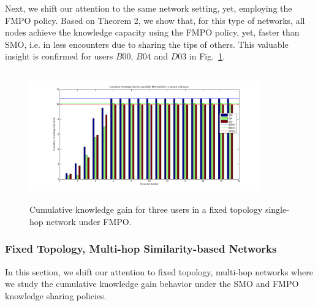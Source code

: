 \documentclass[conference]{IEEEtran}
\theoremstyle{definition}
\begin{document}
Next, we shift our attention to the same network setting, yet, employing the FMPO policy.
Based on Theorem 2, we show that, for this type of networks, all nodes achieve the knowledge capacity using the FMPO policy, yet, faster than SMO, i.e. in less encounters due to sharing the tips of others. This valuable insight is confirmed for users $B00$, $B04$ and $D03$ in Fig.~\ref{fig:B00_SSHOP(MO)}.
%
\begin{figure}[!bp]
\centering
    \includegraphics[width=10cm ,height=5.6cm]{figures_png/Fig6}
    \caption{Cumulative knowledge gain for three users in a fixed topology single-hop network under FMPO.}\label{fig:B00_SSHOP(MO)}
\end{figure}
\vspace{-0.4 cm}
\subsubsection{Fixed Topology, Multi-hop Similarity-based Networks}
\vspace{-0.2 cm}
In this section, we shift our attention to fixed topology, multi-hop networks 
where we study the cumulative knowledge gain behavior under the SMO and FMPO knowledge sharing policies.
\end{document}
